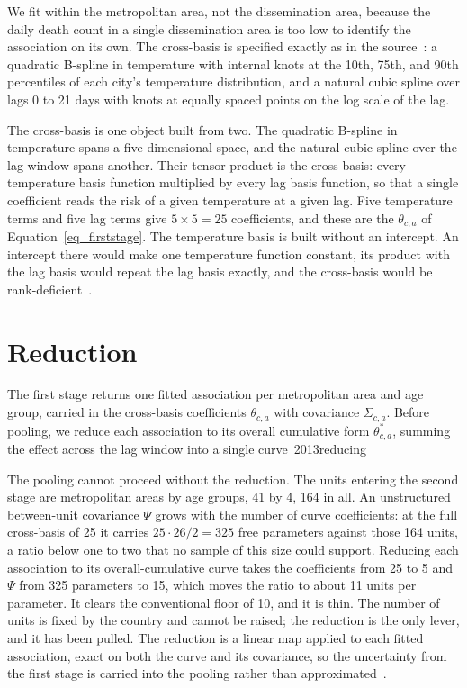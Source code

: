 We fit within the metropolitan area, not the dissemination area, because the daily death count in a single dissemination area is too low to identify the association on its own. The cross-basis is specified exactly as in the source~\citep{gasparrini2022smallarea}: a quadratic B-spline in temperature with internal knots at the 10th, 75th, and 90th percentiles of each city's temperature distribution, and a natural cubic spline over lags 0 to 21 days with knots at equally spaced points on the log scale of the lag.

The cross-basis is one object built from two. The quadratic B-spline in temperature spans a five-dimensional space, and the natural cubic spline over the lag window spans another. Their tensor product is the cross-basis: every temperature basis function multiplied by every lag basis function, so that a single coefficient reads the risk of a given temperature at a given lag. Five temperature terms and five lag terms give $5 \times 5 = 25$ coefficients, and these are the $\theta_{c,a}$ of Equation~\ref{eq_firststage}. The temperature basis is built without an intercept. An intercept there would make one temperature function constant, its product with the lag basis would repeat the lag basis exactly, and the cross-basis would be rank-deficient~\citep{gasparrini2014dlnm}.
 
\section{Reduction}
 
The first stage returns one fitted association per metropolitan area and age group, carried in the cross-basis coefficients $\theta_{c,a}$ with covariance $\Sigma_{c,a}$. Before pooling, we reduce each association to its overall cumulative form $\theta^{*}_{c,a}$, summing the effect across the lag window into a single curve~\citepgasparrini2013reducing

The pooling cannot proceed without the reduction. The units entering the second stage are metropolitan areas by age groups, 41 by 4, 164 in all. An unstructured between-unit covariance $\Psi$ grows with the number of curve coefficients: at the full cross-basis of 25 it carries $25 \cdot 26 / 2 = 325$ free parameters against those 164 units, a ratio below one to two that no sample of this size could support. Reducing each association to its overall-cumulative curve takes the coefficients from 25 to 5 and $\Psi$ from 325 parameters to 15, which moves the ratio to about 11 units per parameter. It clears the conventional floor of 10, and it is thin. The number of units is fixed by the country and cannot be raised; the reduction is the only lever, and it has been pulled. The reduction is a linear map applied to each fitted association, exact on both the curve and its covariance, so the uncertainty from the first stage is carried into the pooling rather than approximated~\citep{gasparrini2013reduce}.
 
